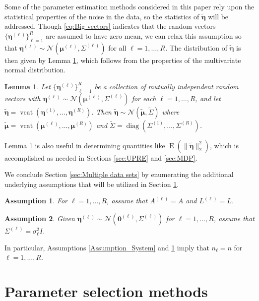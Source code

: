 \documentclass[12pt]{article}
\DeclareMathOperator{\diag}{diag}	%
\DeclareMathOperator{\vcat}{vcat}	%
\newcommand{\noise}{\eta}	%
\newcommand{\noiseSD}{\sigma}	%
\newcommand{\noiseVec}{\bm{\noise}}	%
\DeclareMathOperator{\E}{E}	%
\newcommand{\zeroVec}{\bm{0}}	%
\newtheorem{assumption}{Assumption}
\newtheorem{lemma}{Lemma}[section]
\begin{document}
Some of the parameter estimation methods considered in this paper rely upon the statistical properties of the noise in the data, so the statistics of $\widetilde{\noiseVec}$ will be addressed. Though \eqref{eq:Big vectors} indicates that the random vectors $\{\noiseVec^{(\ell)}\}_{\ell=1}^R$ are assumed to have zero mean, we can relax this assumption so that $\noiseVec^{(\ell)} \sim \mathcal{N}(\bm{\mu}^{(\ell)},\Sigma^{(\ell)})$ for all $\ell = 1,\ldots,R$. The distribution of $\widetilde{\noiseVec}$ is then given by Lemma \ref{lem:Concatenation of Normal Noise}, which follows from the properties of the multivariate normal distribution. 
\begin{lemma}
\label{lem:Concatenation of Normal Noise}
Let $\{\noiseVec^{(\ell)}\}_{\ell=1}^R$ be a collection of mutually independent random vectors with $\noiseVec^{(\ell)} \sim \mathcal{N}(\bm{\mu}^{(\ell)},\Sigma^{(\ell)})$ for each $\ell = 1,\ldots,R$, and let $\widetilde{\noiseVec} = \vcat(\noiseVec^{(1)},\ldots,\noiseVec^{(R)})$. Then $\widetilde{\noiseVec} \sim \mathcal{N}(\widetilde{\bm{\mu}},\widetilde{\Sigma})$ where $\widetilde{\bm{\mu}} = \vcat(\bm{\mu}^{(\ell)},\ldots,\bm{\mu}^{(R)})$ and $\widetilde{\Sigma} = \diag(\Sigma^{(1)},\ldots,\Sigma^{(R)})$.
\end{lemma}
\noindent Lemma \ref{lem:Concatenation of Normal Noise} is also useful in determining quantities like $\E(\|\widetilde{\noiseVec}\|_2^2)$, which is accomplished as needed in Sections \ref{sec:UPRE} and \ref{sec:MDP}. \par
We conclude Section \ref{sec:Multiple data sets} by enumerating the additional underlying assumptions that will be utilized in Section \ref{sec:Methods}.

\begin{assumption}
\label{Assumption_Matrices}
For $\ell = 1,\ldots,R$, assume that $A^{(\ell)} = A$ and $L^{(\ell)} = L$.
\end{assumption}  

\begin{assumption}
\label{Assumption_Noise}
Given $\noiseVec^{(\ell)} \sim \mathcal{N}(\zeroVec^{(\ell)},\Sigma^{(\ell)})$ for $\ell = 1,\ldots,R$, assume that $\Sigma^{(\ell)} = \noiseSD_\ell^2I$.
\end{assumption}
\noindent In particular, Assumptions \ref{Assumption_System} and \ref{Assumption_Matrices} imply that $n_\ell = n$ for $\ell = 1,\ldots,R$.

\section{Parameter selection methods} \label{sec:Methods}
\end{document}
